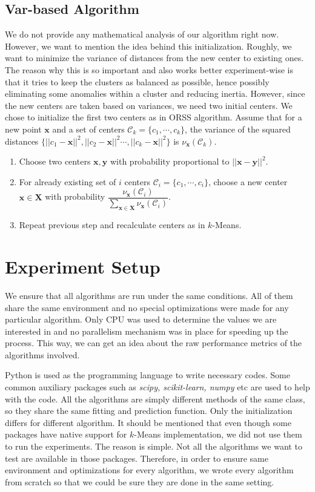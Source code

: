 \documentclass[10pt, leqno]{article}
\begin{document}
	\subsection{Var-based Algorithm}
	We do not provide any mathematical analysis of our algorithm right now. However, we want to mention the idea behind this initialization. Roughly, we want to minimize the variance of distances from the new center to existing ones. The reason why this is so important and also works better experiment-wise is that it tries to keep the clusters as balanced as possible, hence possibly eliminating some anomalies within a cluster and reducing inertia. However, since the new centers are taken based on variances, we need two initial centers. We chose to initialize the first two centers as in ORSS algorithm. Assume that for a new point $\mathbf{x}$ and a set of centers $\mathcal{C}_k=\{c_1,\cdots,c_k\}$, the variance of the squared distances $\{||c_1-\mathbf{x}||^2,||c_2-\mathbf{x}||^2\cdots,||c_k-\mathbf{x}||^2\}$ is $\nu_\mathbf{x}(\mathcal{C}_k)$.
		\begin{enumerate}[i]
			\item Choose two centers $\mathbf{x},\mathbf{y}$ with probability proportional to $||\mathbf{x}-\mathbf{y}||^2$.
			\item For already existing set of $i$ centers $\mathcal{C}_i=\{c_1,\cdots,c_i\}$, choose a new center $\mathbf{x}\in\mathbf{X}$ with probability $\dfrac{\nu_\mathbf{x}(\mathcal{C}_i)}{\sum_{\mathbf{x}\in\mathbf{X}}\nu_\mathbf{x}(\mathcal{C}_i)}$.
			\item Repeat previous step and recalculate centers as in $k$-Means.
		\end{enumerate}
	\section{Experiment Setup}
	We ensure that all algorithms are run under the same conditions. All of them share the same environment and no special optimizations were made for any particular algorithm. Only CPU was used to determine the values we are interested in and no parallelism mechanism was in place for speeding up the process. This way, we can get an idea about the raw performance metrics of the algorithms involved.
	
	Python is used as the programming language to write necessary codes. Some common auxiliary packages such as \textit{scipy, scikit-learn, numpy} etc are used to help with the code. All the algorithms are simply different methods of the same class, so they share the same fitting and prediction function. Only the initialization differs for different algorithm. It should be mentioned that even though some packages have native support for $k$-Means implementation, we did not use them to run the experiments. The reason is simple. Not all the algorithms we want to test are available in those packages. Therefore, in order to ensure same environment and optimizations for every algorithm, we wrote every algorithm from scratch so that we could be sure they are done in the same setting.
	
\end{document}
